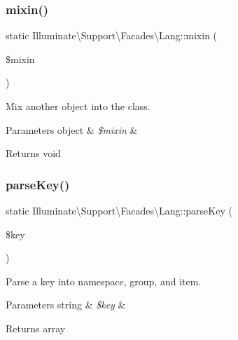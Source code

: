 \subsubsection{\texorpdfstring{mixin()}{mixin()}}
{\footnotesize\ttfamily static Illuminate\textbackslash{}\+Support\textbackslash{}\+Facades\textbackslash{}\+Lang\+::mixin (\begin{DoxyParamCaption}\item[{}]{\$mixin }\end{DoxyParamCaption})\hspace{0.3cm}{\ttfamily [static]}}

Mix another object into the class.


\begin{DoxyParams}[1]{Parameters}
object & {\em \$mixin} & \\
\hline
\end{DoxyParams}
\begin{DoxyReturn}{Returns}
void 
\end{DoxyReturn}
\mbox{\label{class_illuminate_1_1_support_1_1_facades_1_1_lang_aac2a9b78d2633d1ded279422f448576d}} 
\subsubsection{\texorpdfstring{parse\+Key()}{parseKey()}}
{\footnotesize\ttfamily static Illuminate\textbackslash{}\+Support\textbackslash{}\+Facades\textbackslash{}\+Lang\+::parse\+Key (\begin{DoxyParamCaption}\item[{}]{\$key }\end{DoxyParamCaption})\hspace{0.3cm}{\ttfamily [static]}}

Parse a key into namespace, group, and item.


\begin{DoxyParams}[1]{Parameters}
string & {\em \$key} & \\
\hline
\end{DoxyParams}
\begin{DoxyReturn}{Returns}
array 
\end{DoxyReturn}
\mbox{\label{class_illuminate_1_1_support_1_1_facades_1_1_lang_a36c9cbddc88f2629de99fd88097d911b}} 
